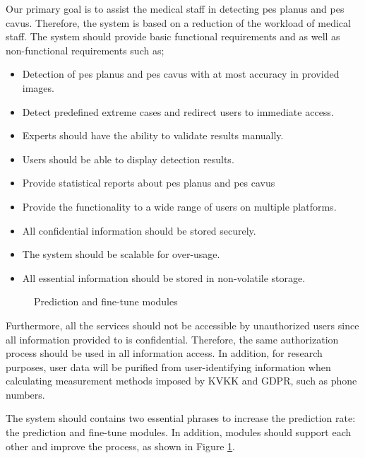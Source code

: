 Our primary goal is to assist the medical staff in detecting pes planus and pes cavus. Therefore, the system is based on a reduction of the workload of medical staff. The system should provide basic functional requirements and as well as non-functional requirements such as;
\begin{itemize}
  \item Detection of pes planus and pes cavus with at most accuracy in provided images.
  \item Detect predefined extreme cases and redirect users to immediate access.
  \item Experts should have the ability to validate results manually.
  \item Users should be able to display detection results.
  \item Provide statistical reports about pes planus and pes cavus 
  \item Provide the functionality to a wide range of users on multiple platforms.
  \item All confidential information should be stored securely.
  \item The system should be scalable for over-usage.
  \item All essential information should be stored in non-volatile storage.
\end{itemize}

\begin{figure}[htbp]
\centering
{}
\caption{Prediction and fine-tune modules}
\label{fig:PredictionAndFinetuneModules}
\end{figure}

Furthermore, all the services should not be accessible by unauthorized users since all information provided to is confidential. Therefore, the same authorization process should be used in all information access. In addition, for research purposes, user data will be purified from user-identifying information when calculating measurement methods imposed by KVKK and GDPR, such as phone numbers.

The system should contains two essential phrases to increase the prediction rate: the prediction and fine-tune modules. In addition, modules should support each other and improve the process, as shown in Figure \ref{fig:PredictionAndFinetuneModules}.

